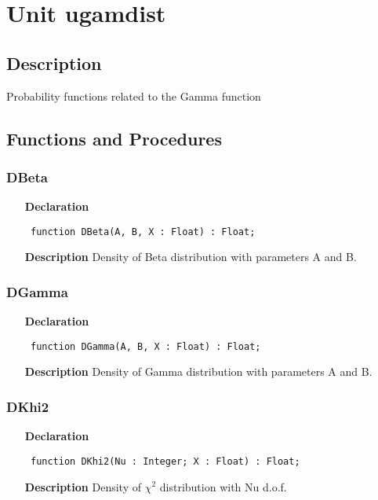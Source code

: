 \documentclass[12pt,a4paper,oneside]{report}
\newcommand{\declarationitem}[1]{\textbf{#1}}
\newcommand{\descriptiontitle}[1]{\textbf{#1}}
\newcommand{\code}[1]{\texttt{#1}}
\begin{document}
\section{Unit ugamdist}
\label{ugamdist}
\subsection{Description}
Probability functions related to the Gamma function 
\subsection{Functions and Procedures}
\subsubsection{DBeta}
\label{ugamdist-DBeta}
\begin{itemize}\item[\declarationitem{Declaration}\hfill]
	\begin{flushleft}
		\code{
			function DBeta(A, B, X : Float) : Float;}
	\end{flushleft}
	\item[\descriptiontitle{Description}]
	Density of Beta distribution with parameters A and B.
\end{itemize}
\subsubsection{DGamma}
\label{ugamdist-DGamma}
\begin{itemize}\item[\declarationitem{Declaration}\hfill]
	\begin{flushleft}
		\code{
			function DGamma(A, B, X : Float) : Float;}
	\end{flushleft}
	\item[\descriptiontitle{Description}]
	Density of Gamma distribution with parameters A and B.
\end{itemize}
\subsubsection{DKhi2}
\label{ugamdist-DKhi2}
\begin{itemize}\item[\declarationitem{Declaration}\hfill]
	\begin{flushleft}
		\code{
			function DKhi2(Nu : Integer; X : Float) : Float;}
	\end{flushleft}
	\item[\descriptiontitle{Description}]
	Density of $\chi^2$ distribution with Nu d.o.f.
\end{itemize}
\end{document}
